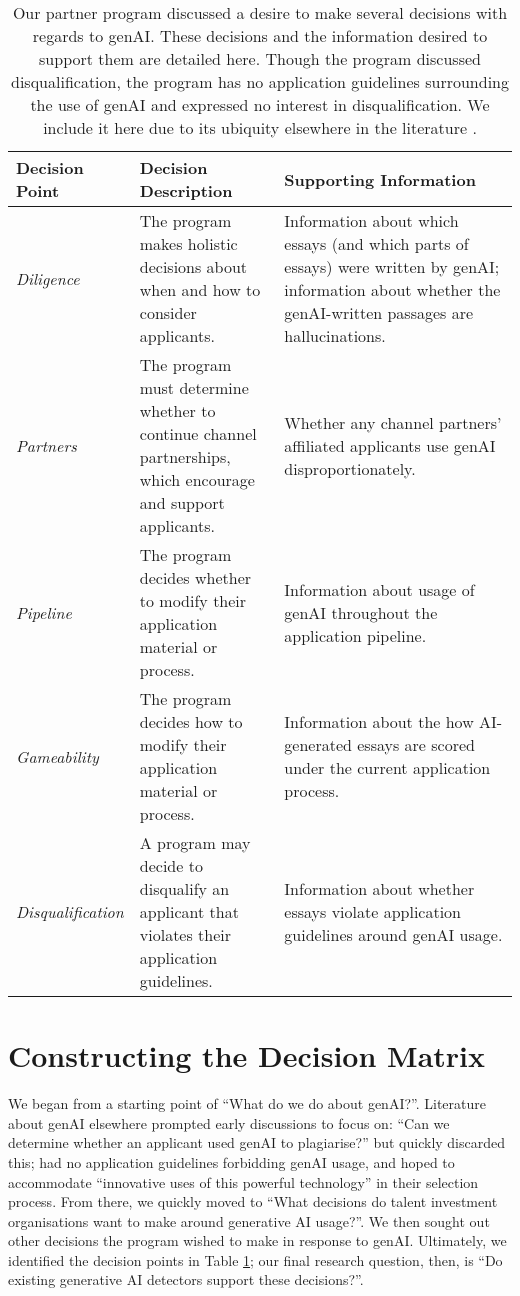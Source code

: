 \begin{table}[htbp]
  \centering
  \caption{Our partner program discussed a desire to make several decisions with regards to genAI. These decisions and the information desired to support them are detailed here. Though the program discussed disqualification, the program has no application guidelines surrounding the use of genAI and expressed no interest in disqualification. We include it here due to its ubiquity elsewhere in the literature \cite{liang_gpt_2023,mitchell_detectgpt_2023,tharindu_kumarage_stylometric_2023,kalpesh_krishna_paraphrasing_2023}.}
  \label{tab:decisions}
  \begin{tabular}{ p{0.2\linewidth}p{0.3\linewidth}p{0.5\linewidth}}
      \toprule
      Decision Point & Decision Description & Supporting Information \\
      \midrule
      \emph{Diligence} & The program makes holistic decisions about when and how to consider applicants. & Information about which essays (and which parts of essays) were written by genAI; information about whether the genAI-written passages are hallucinations. \\ 
      \emph{Partners} & The program must determine whether to continue channel partnerships, which encourage and support applicants. & Whether any channel partners' affiliated applicants use genAI disproportionately. \\
      \emph{Pipeline} & The program decides whether to modify their application material or process. & Information about usage of genAI throughout the application pipeline. \\
      \emph{Gameability} & The program decides how to modify their application material or process. & Information about the how AI-generated essays are scored under the current application process. \\
      \midrule
      \emph{Disqualification} & A program may decide to disqualify an applicant that violates their application guidelines. & Information about whether essays violate application guidelines around genAI usage. \\
      \bottomrule
  \end{tabular}
\end{table}


\section{Constructing the Decision Matrix}\label{ssec:poi}
We began from a starting point of ``What do we do about genAI?''. Literature about genAI elsewhere prompted early discussions to focus on: ``Can we determine whether an applicant used genAI to plagiarise?'' but quickly discarded this; \rise had no application guidelines forbidding genAI usage, and hoped to accommodate ``innovative uses of this powerful technology'' in their selection process. From there, we quickly moved to ``What decisions do talent investment organisations want to make around generative AI usage?''. We then sought out other decisions the program wished to make in response to genAI. Ultimately, we identified the decision points in Table \ref{tab:decisions}; our final research question, then, is ``Do existing generative AI detectors support these decisions?''.

